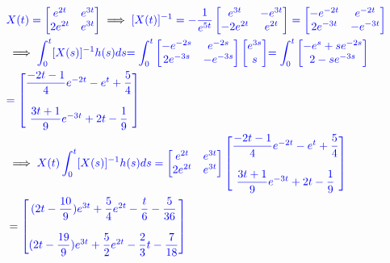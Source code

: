 \documentclass[a4paper]{article}
\begin{document}
\begin{align}
&\textcolor{blue}{X(t)= \begin{bmatrix} e^{2t} & e^{3t}\\ 2e^{2t} & e^{3t} \end{bmatrix}} \implies \textcolor{blue}{[X(t)]^{-1}= -\dfrac{1}{e^{5t}} \begin{bmatrix} e^{3t} & -e^{3t}\\ -2e^{2t} & e^{2t} \end{bmatrix}= \begin{bmatrix} 
 -e^{-2t} & e^{-2t}\\ 2e^{-3t} & -e^{-3t} \end{bmatrix} }\\
&\implies  \textcolor{blue}
{\int_{0}^{t}[X(s)]^{-1}h(s) ds }\textcolor{blue}{=\int_{0}^{t}\begin{bmatrix} 
 -e^{-2s} & e^{-2s}\\ 2e^{-3s} & -e^{-3s} \end{bmatrix} \begin{bmatrix} e^{3s} \\ s\end{bmatrix}}
 \textcolor{blue}{= \int_{0}^{t}\begin{bmatrix} -e^{s}+se^{-2s} \\ 2-se^{-3s} \end{bmatrix}}\\
 &\textcolor{blue}{= \begin{bmatrix} \dfrac{-2t-1}{4}e^{-2t}-e^{t}+\dfrac{5}{4}\\\\ \dfrac{3t+1}{9}e^{-3t}+2t-\dfrac{1}{9}\end{bmatrix}} 
 \\ &\implies \textcolor{blue}
{X(t)\int_{0}^{t}[X(s)]^{-1}h(s) ds =\begin{bmatrix} e^{2t} & e^{3t}\\ 2e^{2t} & e^{3t} \end{bmatrix}\begin{bmatrix} \dfrac{-2t-1}{4}e^{-2t}-e^{t}+\dfrac{5}{4}\\\\ \dfrac{3t+1}{9}e^{-3t}+2t-\dfrac{1}{9}\end{bmatrix}}\\ 
&=\textcolor{blue}{
\begin{bmatrix} (2t-\dfrac{10}{9})e^{3t}+\dfrac{5}{4}e^{2t} -\dfrac{t}{6}-\dfrac{5}{36}  \\\\ (2t-\dfrac{19}{9})e^{3t}+\dfrac{5}{2}e^{2t}- \dfrac{2}{3}t-\dfrac{7}{18}\end{bmatrix}}
 \end{align}
\end{document}
